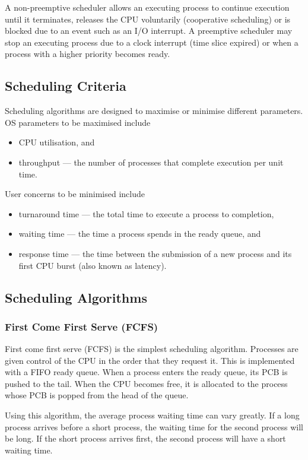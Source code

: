 A non-preemptive scheduler allows an executing process to continue execution until it terminates, releases the CPU voluntarily (cooperative scheduling) or is blocked due to an event such as an I/O interrupt.
A preemptive scheduler may stop an executing process due to a clock interrupt (time slice expired) or when a process with a higher priority becomes ready.

\subsection{Scheduling Criteria}

Scheduling algorithms are designed to maximise or minimise different parameters.
OS parameters to be maximised include
\begin{itemize}
  \item CPU utilisation, and
  \item throughput --- the number of processes that complete execution per unit time.
\end{itemize}
User concerns to be minimised include
\begin{itemize}
  \item turnaround time --- the total time to execute a process to completion,
  \item waiting time --- the time a process spends in the ready queue, and
  \item response time --- the time between the submission of a new process and its first CPU burst (also known as latency).
\end{itemize}

\subsection{Scheduling Algorithms}

\subsubsection{First Come First Serve (FCFS)}

First come first serve (FCFS) is the simplest scheduling algorithm.
Processes are given control of the CPU in the order that they request it.
This is implemented with a FIFO ready queue.
When a process enters the ready queue, its PCB is pushed to the tail.
When the CPU becomes free, it is allocated to the process whose PCB is popped from the head of the queue.

Using this algorithm, the average process waiting time can vary greatly.
If a long process arrives before a short process, the waiting time for the second process will be long.
If the short process arrives first, the second process will have a short waiting time.

